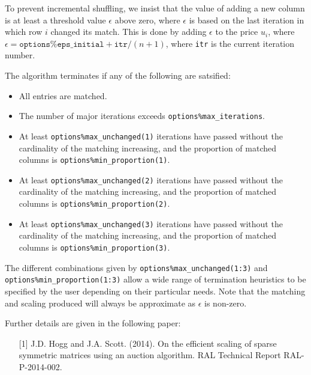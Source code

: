 To prevent incremental shuffling, we insist that the value of
adding a new column is at least a threshold value $\epsilon$ above zero, where
$\epsilon$ is based on the last iteration in which row $i$ changed its match.
This is done by adding $\epsilon$ to the price $u_i$, where $\epsilon = \texttt{options\%eps\_initial} + \texttt{itr} / (n+1)$, where \texttt{itr} is the current iteration number.

The algorithm terminates if any of the following are satsified:
\begin{itemize}
   \item All entries are matched.
   \item The number of major iterations exceeds \texttt{options\%max\_iterations}.
   \item At least \texttt{options\%max\_unchanged(1)} iterations have passed without the cardinality of the matching increasing, and the proportion of matched columns is \texttt{options\%min\_proportion(1)}.
   \item At least \texttt{options\%max\_unchanged(2)} iterations have passed without the cardinality of the matching increasing, and the proportion of matched columns is \texttt{options\%min\_proportion(2)}.
   \item At least \texttt{options\%max\_unchanged(3)} iterations have passed without the cardinality of the matching increasing, and the proportion of matched columns is \texttt{options\%min\_proportion(3)}.
\end{itemize}

The different combinations given by \texttt{options\%max\_unchanged(1:3)}
and
\texttt{options\%min\_proportion(1:3)} allow a wide range of termination
heuristics to be specified by the user depending on their particular needs. Note
that the matching and scaling produced will always be approximate as
$\epsilon$ is non-zero.

\vspace{0.2cm}
\noindent
Further details are given in the following paper:
\vspace{-0.2cm}
\begin{itemize}
   \item[{[1]}] J.D. Hogg and J.A. Scott. (2014). On the efficient scaling of sparse symmetric matrices using an auction algorithm. RAL Technical Report RAL-P-2014-002.
\end{itemize}

